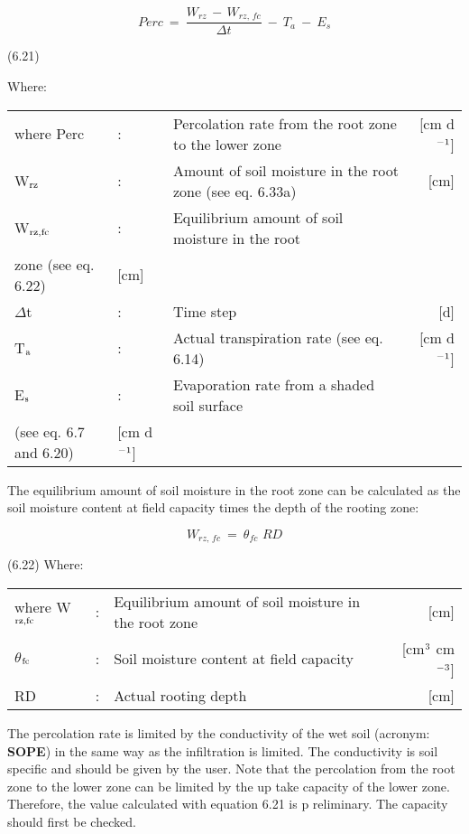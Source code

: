 \begin{equation}
Perc  ~=~{\frac{W _{rz} \, -\, W _{rz,\, fc} }{\Delta t}} ~-~ T _{a} ~-~ E _{s} 
\end{equation}

 
\strut\hfill (6.21)

Where:\\
\begin{tabularx}{\textwidth}{llXr}



where Perc &:& Percolation rate from the root zone to the lower zone  & [cm d$^{{\rm -1}}$]\\
W$_{{\rm rz}}$ &:& Amount of soil moisture in the root zone (see eq. 6.33a)  & [cm]\\
W$_{{\rm rz,fc}}$ &:& Equilibrium amount of soil moisture in the root\\
   zone (see eq. 6.22)  & [cm]\\
$\Delta$t &:& Time step  & [d]\\
T$_{{\rm a}}$ &:& Actual transpiration rate (see eq. 6.14)  & [cm d$^{{\rm -1}}$]\\
E$_{{\rm s}}$ &:& Evaporation rate from a shaded soil surface \\
  (see eq. 6.7  and 6.20)  & [cm d$^{{\rm -1}}$]
\end{tabularx}
 The equilibrium amount of soil moisture in the root zone can be calculated as the soil
moisture content at field capacity times the depth of the rooting zone:

\begin{equation}
W _{rz,\, fc} ~=~ \theta  _{fc} \,\, RD
\end{equation}

 
\strut\hfill (6.22)
Where:\\
\begin{tabularx}{\textwidth}{llXr}



where W$_{{\rm rz,fc}}$ &:& Equilibrium amount of soil moisture in the root zone  & [cm]\\
$\theta$$_{{\rm fc}}$ &:& Soil moisture content at field capacity  & [cm$^{{\rm 3}}$ cm$^{{\rm -3}}$]\\
RD &:& Actual rooting depth  & [cm]
\end{tabularx}



The percolation rate is limited by the conduc\-tivity of the wet soil (acronym: {\bf SOPE}) in the
same way as the infiltration is limited. The conductivity is soil specific and should be
given by the user. Note that the percolation from the root zone to the lower zone can be
limited by the up take capacity of the lower zone. Therefore, the value calculated with 
equation 6.21 is p reliminary. The capacity should first be checked.



